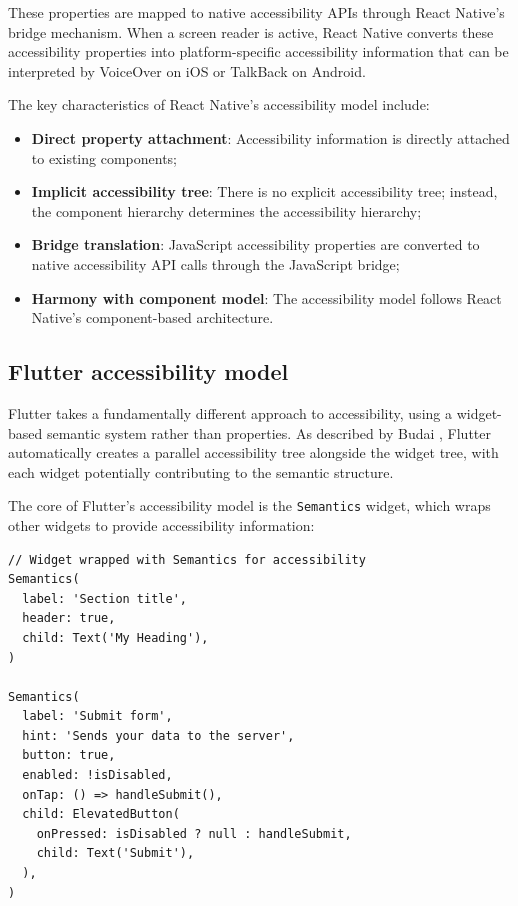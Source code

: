 These properties are mapped to native accessibility APIs through React Native's bridge mechanism. When a screen reader is active, React Native converts these accessibility properties into platform-specific accessibility information that can be interpreted by VoiceOver on iOS or TalkBack on Android.

The key characteristics of React Native's accessibility model include:

\begin{itemize}
    \item \textbf{Direct property attachment}: Accessibility information is directly attached to existing components;
    \item \textbf{Implicit accessibility tree}: There is no explicit accessibility tree; instead, the component hierarchy determines the accessibility hierarchy;
    \item \textbf{Bridge translation}: JavaScript accessibility properties are converted to native accessibility API calls through the JavaScript bridge;
    \item \textbf{Harmony with component model}: The accessibility model follows React Native's component-based architecture.
\end{itemize}

\subsection{Flutter accessibility model}
Flutter takes a fundamentally different approach to accessibility, using a widget-based semantic system rather than properties. As described by Budai \cite{budai2024mobile}, Flutter automatically creates a parallel accessibility tree alongside the widget tree, with each widget potentially contributing to the semantic structure.

The core of Flutter's accessibility model is the \texttt{Semantics} widget, which wraps other widgets to provide accessibility information:

\begin{lstlisting}[style=DartStyle, caption=Flutter Semantics widget system, label=lst:flutter-semantics]
// Widget wrapped with Semantics for accessibility
Semantics(
  label: 'Section title',
  header: true,
  child: Text('My Heading'),
)

Semantics(
  label: 'Submit form',
  hint: 'Sends your data to the server',
  button: true,
  enabled: !isDisabled,
  onTap: () => handleSubmit(),
  child: ElevatedButton(
    onPressed: isDisabled ? null : handleSubmit,
    child: Text('Submit'),
  ),
)
\end{lstlisting}


